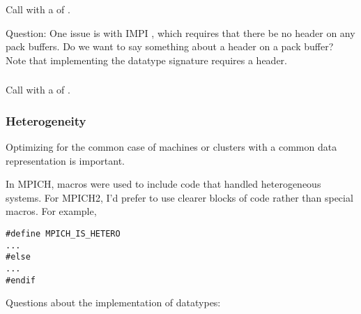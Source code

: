 \documentclass{article}
\begin{document}
\subsubsection{}
Call  with a  of .

Question: One issue is with IMPI \cite{impi}, which requires that there be no
header on any pack buffers.  Do we want to say something about a header on a
pack buffer?  Note that implementing the datatype signature
\cite{gro:mpi-datatypes:pvmmpi00} requires a header. 

\subsubsection{}
Call  with a  of .

\subsubsection{Heterogeneity}
\label{sec:hetero}
Optimizing for the common case of machines or clusters with a common
data representation is important.  

In MPICH, macros were used to include code that handled heterogeneous
systems.  For MPICH2, I'd prefer to use clearer blocks of code rather
than special macros.  For example,
\begin{verbatim}
#define MPICH_IS_HETERO
...
#else
...
#endif
\end{verbatim}

Questions about the implementation of datatypes:
\end{document}

